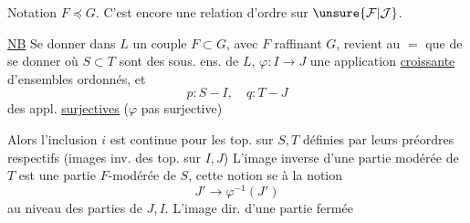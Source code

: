 Notation $F\preccurlyeq G$. C'est encore une relation d'ordre sur $\unsure{\mathcal F|\mathcal J}$.

\uline{NB} Se donner dans $L$ un couple $F\subset G$, avec $F$ raffinant $G$, revient au $=$ que de se donner
où $S\subset T$ sont des sous. ens. de $L$, $\varphi:I\longrightarrow J$ une application \uline{croissante} d'ensembles ordonnés, et 
\[p:S-I,\quad q:T-J\]
des appl. \uline{surjectives} ($\varphi$ pas  surjective)

Alors l'inclusion $i$ est continue pour les top.  sur $S,T$ définies par leurs préordres respectifs (images inv. des top. sur $I,J$) L'image inverse d'une partie modérée de $T$ est une partie $F$-modérée de $S$, cette notion se  à la notion
\[J'\longrightarrow\varphi^{-1}(J')\]
au niveau des parties de $J,I$. L'image dir. d'une partie fermée
